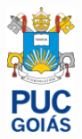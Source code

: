 \documentclass[12pt,a4paper,oneside,brazil]{abntex2}
\begin{document}
\renewcommand{\listfigurename}{Lista de Figuras}
\renewcommand{\listtablename}{Lista de Tabelas}
\renewcommand{\contentsname}{Sumário}

\begin{capa}
    \center

    \OnehalfSpacing
    \ABNTEXchapterfont\bfseries{\textsc{\MakeUppercase{\imprimirinstituicao}}}

    \vfill

    \includegraphics[width=0.15\textwidth]{./src/assets/logo.png}

    \vfill

    \ABNTEXchapterfont\bfseries{\MakeUppercase{\imprimirtitulo}}

    \vfill

    \MakeUppercase{\imprimirautor}

    \vfill

    \bfseries{\MakeUppercase{\imprimirlocal}}

    \bfseries{\MakeUppercase{\imprimirdata}}
\end{capa}
\end{document}
